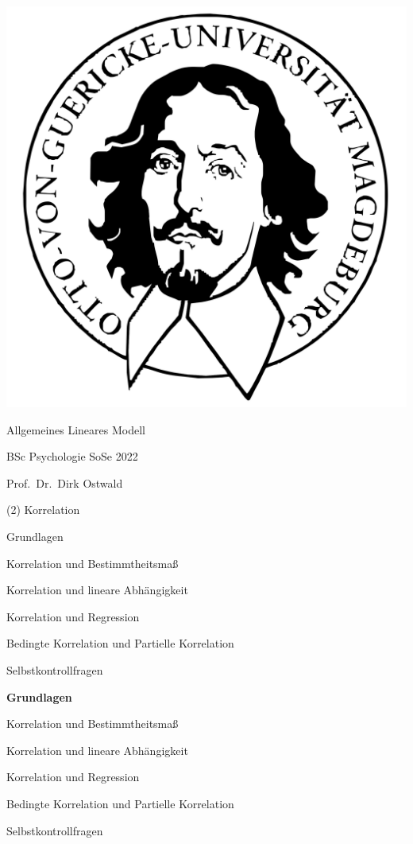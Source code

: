 \documentclass[
  8pt,
  ignorenonframetext,
]{beamer}
\author{}
\date{\vspace{-2.5em}}
\begin{document}
\begin{frame}[plain]{}
\protect\hypertarget{section}{}
\center

\begin{center}\includegraphics[width=0.2\linewidth]{2_Abbildungen/alm_2_otto} \end{center}

\vspace{2mm}

\huge

Allgemeines Lineares Modell \vspace{6mm}

\large

BSc Psychologie SoSe 2022

\vspace{6mm}
\normalsize

Prof.~Dr.~Dirk Ostwald
\end{frame}

\begin{frame}[plain]{}
\protect\hypertarget{section-1}{}
\center
\huge
\vfill

\noindent (2) Korrelation \vfill
\end{frame}

\begin{frame}{}
\protect\hypertarget{section-2}{}
\vfill
\large

Grundlagen

Korrelation und Bestimmtheitsmaß

Korrelation und lineare Abhängigkeit

Korrelation und Regression

Bedingte Korrelation und Partielle Korrelation

Selbstkontrollfragen

\vfill
\end{frame}

\begin{frame}{}
\protect\hypertarget{section-3}{}
\vfill
\large

\textbf{Grundlagen}

Korrelation und Bestimmtheitsmaß

Korrelation und lineare Abhängigkeit

Korrelation und Regression

Bedingte Korrelation und Partielle Korrelation

Selbstkontrollfragen

\vfill
\end{frame}
\end{document}
